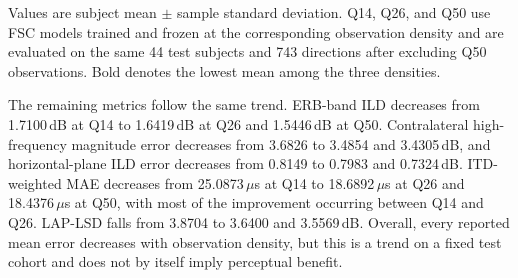 \documentclass[UTF8,a4paper]{article}
\begin{document}
\begin{table}[htbp]
\centering\scriptsize
\setlength{\tabcolsep}{2.3pt}
\caption{Results of the FSC sparsity experiment (44 test subjects, 743 shared directions)}
\label{tab:q-results}
\par\smallskip
\parbox{\linewidth}{\footnotesize Values are subject mean $\pm$ sample standard deviation. Q14, Q26, and Q50 use FSC models trained and frozen at the corresponding observation density and are evaluated on the same 44 test subjects and 743 directions after excluding Q50 observations. Bold denotes the lowest mean among the three densities.}
\end{table}

The remaining metrics follow the same trend. ERB-band ILD decreases from 1.7100\,dB at Q14 to 1.6419\,dB at Q26 and 1.5446\,dB at Q50. Contralateral high-frequency magnitude error decreases from 3.6826 to 3.4854 and 3.4305\,dB, and horizontal-plane ILD error decreases from 0.8149 to 0.7983 and 0.7324\,dB. ITD-weighted MAE decreases from 25.0873\,$\mu$s at Q14 to 18.6892\,$\mu$s at Q26 and 18.4376\,$\mu$s at Q50, with most of the improvement occurring between Q14 and Q26. LAP-LSD falls from 3.8704 to 3.6400 and 3.5569\,dB. Overall, every reported mean error decreases with observation density, but this is a trend on a fixed test cohort and does not by itself imply perceptual benefit.
\end{document}
